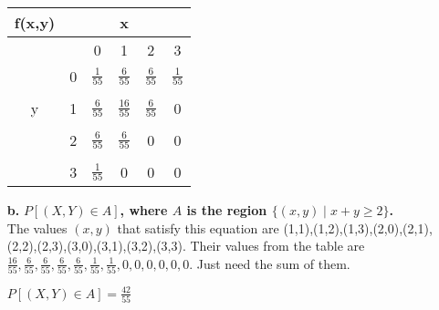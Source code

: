\documentclass{article}
\begin{document}
\begin{enumerate}
\begin{center}
\begin{tabular}{|c|c|c c c c|}
\hline
   f(x,y) &&& x &&\\
\hline
   &   & 0 & 1 & 2 & 3\\
\hline
   & 0 & $\frac{1}{55}$ & $\frac{6}{55}$ & $\frac{6}{55}$ & $\frac{1}{55}$\\
   &&&&&\\
 y & 1 & $\frac{6}{55}$ & $\frac{16}{55}$ & $\frac{6}{55}$ & 0\\
   &&&&&\\
   & 2 & $\frac{6}{55}$ & $\frac{6}{55}$ & 0 & 0\\
   &&&&&\\
   & 3 & $\frac{1}{55}$ & 0 & 0 & 0\\
\hline
\end{tabular}
\end{center}
\item[\textbf{b.}] \textbf{$P[(X,Y)\in A]$, where $A$ is the region
$\{(x,y)\mid x+y \geq 2\}$.}\\
The values $(x,y)$ that satisfy this equation are 
(1,1),(1,2),(1,3),(2,0),(2,1),(2,2),(2,3),(3,0),(3,1),(3,2),(3,3).
Their values from the table are $\frac{16}{55},\frac{6}{55},\frac{6}{55},
\frac{6}{55},\frac{6}{55},\frac{1}{55},\frac{1}{55},0,0,0,0,0,0$. Just need
the sum of them.
\begin{center}
$P[(X,Y)\in A] = \frac{42}{55}$
\end{center}
\end{enumerate}
\end{document}
